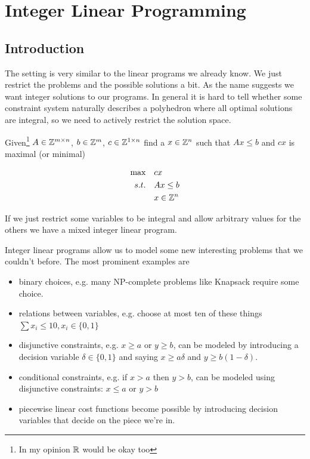 \chapter{Integer Linear Programming}
\section{Introduction}\label{sec:ilpNPcomplete}

The setting is very similar to the linear programs we already know. We just restrict the problems and the possible solutions a bit. As the name suggests we want integer solutions to our programs. In general it is hard to tell whether some constraint system naturally describes a polyhedron where all optimal solutions are integral, so we need to actively restrict the solution space. 

\begin{Def} Given\footnote{In my opinion $\mathbb{R}$ would be okay too} $A\in \mathbb{Z}^{m\times n}$, $b\in \mathbb{Z}^m$, $c\in \mathbb{Z}^{1\times n}$ find a $x\in \mathbb{Z}^n$ such that $Ax\leq b$ and $cx$ is maximal (or minimal)

\begin{align*}
\max \quad & cx \\
s.t. \quad & Ax \leq b\\
&x\in \mathbb{Z}^n
\end{align*}
\end{Def}

If we just restrict some variables to be integral and allow arbitrary values for the others we have a mixed integer linear program.

Integer linear programs allow us to model some new interesting problems that we couldn't before. The most prominent examples are 

\begin{itemize}
\item binary choices, e.g. many NP-complete problems like Knapsack require some choice. 
\item relations between variables, e.g. choose at most ten of these things $\sum x_i \leq 10, x_i\in \{0,1\}$
\item disjunctive constraints, e.g. $x\geq a$ or $y\geq b$, can be modeled by introducing a decision variable $\delta \in \{0,1\}$ and saying $x\geq a\delta$ and $y \geq b(1-\delta)$. 
\item conditional constraints, e.g. if $x>a$ then $y>b$, can be modeled using disjunctive constraints: $x\leq a$ or $y>b$
\item piecewise linear cost functions become possible by introducing decision variables that decide on the piece we're in.
\end{itemize}

